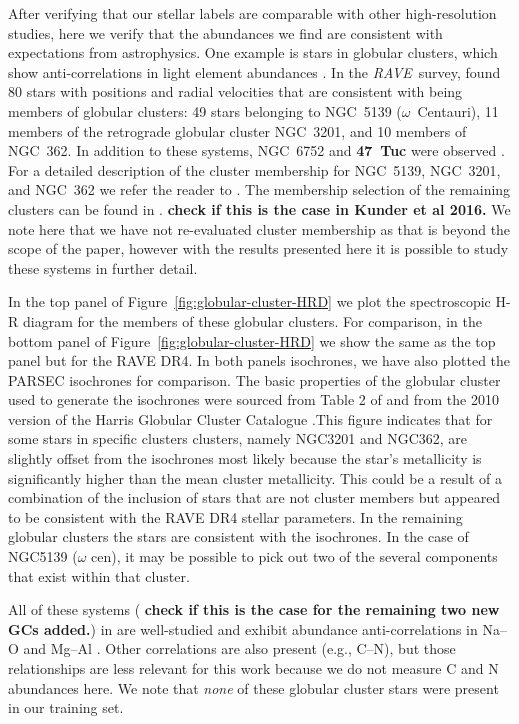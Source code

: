 \documentclass[preprint,trackchanges]{aastex}
\newcommand{\acronym}[1]{{\small{#1}}}
\newcommand{\project}[1]{\textsl{#1}}
\newcommand{\rave}{\project{\acronym{RAVE}}}
\newcommand{\stub}[1]{{\color{blue} \textbf{#1}}}
\begin{document}
After verifying that our stellar labels are comparable with other
high-resolution studies, here we verify that the abundances we find
are consistent with expectations from astrophysics.  One example is stars in
globular clusters, which show anti-correlations in light element abundances 
\citep[e.g.,][and references therein]{Norris_Da_Costa_1995,Carretta_2009}.  In the \rave\
survey, \cite{Anguiano_2015} found 80 stars with positions and radial velocities that are
consistent with being members of globular clusters: 49 stars belonging to NGC~5139 ($\omega$~Centauri), 11 members of the retrograde globular cluster NGC~3201, and 10 members of NGC~362. In addition to these systems, NGC~6752 and \stub{47~Tuc} were observed \citep{Kunder_2016}. For a detailed description of the cluster membership for NGC~5139, NGC~3201, and NGC~362 we refer the reader to \cite{Anguiano_2015}. The membership selection of the remaining clusters can be found in \cite{Kunder_2016}. \stub{check if this is the case in Kunder et al 2016.} We note here that we have not re-evaluated cluster membership as that is beyond the scope of the paper, however with the results presented here it is possible to study these systems in further detail. 

In the top panel of Figure~\ref{fig:globular-cluster-HRD} we plot the spectroscopic H-R diagram for the members of these globular clusters. For comparison, in the bottom panel of Figure~\ref{fig:globular-cluster-HRD} we show the same as the top panel but for the RAVE DR4. In both panels isochrones, we have also plotted the PARSEC isochrones \citep{	
Bressan_2012} for comparison. The basic properties of the globular cluster used to generate the isochrones were sourced from Table 2 of \cite{Kunder_2016} and from the 2010 version of the Harris Globular Cluster Catalogue \citep{Harris_1996}.This figure indicates that for some stars in specific clusters clusters, namely NGC3201 and NGC362, are slightly offset from the isochrones most likely because the star's metallicity is significantly higher than the mean cluster metallicity. This could be a result of a combination of the inclusion of stars that are not cluster members but appeared to be consistent with the RAVE DR4 stellar parameters. In the remaining globular clusters the stars are consistent with the isochrones. In the case of NGC5139 ($\omega$ cen), it may be possible to pick out two of the several components that exist within that cluster.

All of these systems (\stub{check if this is the case for the remaining two new GCs added.}) in \cite{Anguiano_2015} are well-studied and exhibit abundance anti-correlations 
in Na--O and Mg--Al \citep{Marino_2011,Carretta_2009,Carretta_2013,Munoz_2013}.  Other correlations are also present 
(e.g., C--N), but those relationships are less relevant for this work because 
we do not measure C and N abundances here.  We note that \emph{none} of these 
globular cluster stars were present in our training set.
\end{document}
